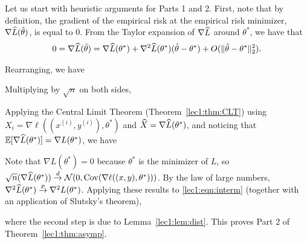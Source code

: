 
Let us start with heuristic arguments for Parts 1 and 2. First, note that by definition, the gradient of the empirical risk at the empirical risk minimizer, $\nabla \widehat{L}(\hat{\theta})$, is equal to $0$. From the Taylor expansion of $\nabla \widehat{L}$ around $\theta^*$, we have that 
\begin{align}
    0 = \nabla \widehat{L}(\hat{\theta}) = \nabla \widehat{L}(\theta^*) + \nabla^2 \widehat{L}(\theta^*)(\hat{\theta} - \theta^*) + O(\|\hat{\theta} - \theta^*\|^2_2).
\end{align}

Rearranging, we have


Multiplying by $\sqrt{n}$ on both sides,

 
Applying the Central Limit Theorem (Theorem~\ref{lec1:thm:CLT}) using $X_i = \nabla \ell ((x^{(i)}, y^{(i)}), \theta^*)$ and $\widehat{X} = \nabla \widehat{L}(\theta^*)$, and noticing that $\operatorname*{\mathbb{E}}[\nabla \widehat{L}(\theta^{*})] = \nabla L(\theta^{*})$, we have
 
Note that $\nabla L(\theta^{*}) = 0$ because $\theta^{*}$ is the minimizer of  $L$, so $\sqrt{n} (\nabla \widehat{L}(\theta^{*})) \overset{d}{\to} \mathcal{N}(0,\operatorname{Cov}(\nabla \ell((x, y), \theta^{*})))$. By the law of large numbers, $\nabla^2 \widehat{L}(\theta^*) \stackrel{p}{\rightarrow} \nabla^2 L(\theta^*)$. Applying these results to \eqref{lec1:eqn:interm} (together with an application of Slutsky's theorem),

where the second step is due to Lemma~\ref{lec1:lem:dist}. This proves Part 2 of Theorem~\ref{lec1:thm:asymp}.

